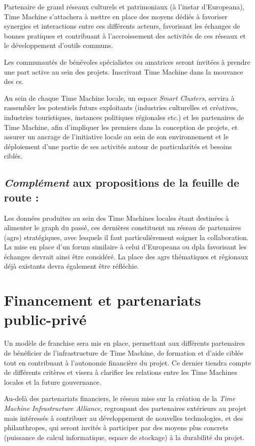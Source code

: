 Partenaire de grand réseaux culturels et patrimoniaux (à l'instar d'Europeana), Time Machine s'attachera à mettre en place des moyens dédiés à favoriser synergies et interactions entre ces différents acteurs, favorisant les échanges de bonnes pratiques et contribuant à l'accroissement des activités de ces réseaux et le développement d'outils communs. 

Les communautés de bénévoles spécialistes ou amatrices seront invitées à prendre une part active au sein des projets. Inscrivant Time Machine dans la mouvance des \gls{cs}.

Au sein de chaque Time Machine locale, un espace \textit{Smart Clusters}, servira à rassembler les potentiels futurs exploitants (industries culturelles et créatives, industries touristiques, instances politiques régionales etc.) et les partenaires de Time Machine, afin  d'impliquer les premiers dans la conception de projets, et assurer un ancrage de l'initiative locale au sein de son environnement et le déploiement d'une partie de ses activités autour de particularités et besoins ciblés.

\subsection{\textit{Complément} aux propositions de la feuille de route :}

Les données produites au sein des Time Machines locales étant destinées à alimenter le \gls{graph} du passé, ces dernières constituent un réseau de partenaires (\gls{agr}s) stratégiques, avec lesquels il faut particulièrement soigner la collaboration. La mise en place d'un forum similaire à celui d'Europeana ou \gls{dpla} favorisant les échanges devrait ainsi être considéré. La place des \gls{agr}s thématiques et régionaux déjà existants devra également être réfléchie.

\section {Financement et partenariats public-privé}

Un modèle de franchise sera mis en place, permettant aux différents partenaires de bénéficier de l'infrastructure de Time Machine, de formation et d'aide ciblée tout en contribuant à l'autonomie financière du projet. Ce dernier tiendra compte de différents critères et visera à clarifier les relations entre les Time Machines locales et la future gouvernance. 

Au-delà des partenariats financiers, le réseau mise sur la création de la \textit{Time Machine Infrastructure Alliance}, regroupant des partenaires extérieurs au projet mais intéressés à contribuer au développement de nouvelles technologies, et des philanthropes, qui seront invités à participer par des moyens plus concrets (puissance de calcul informatique, espace de stockage) à la durabilité du projet. 

